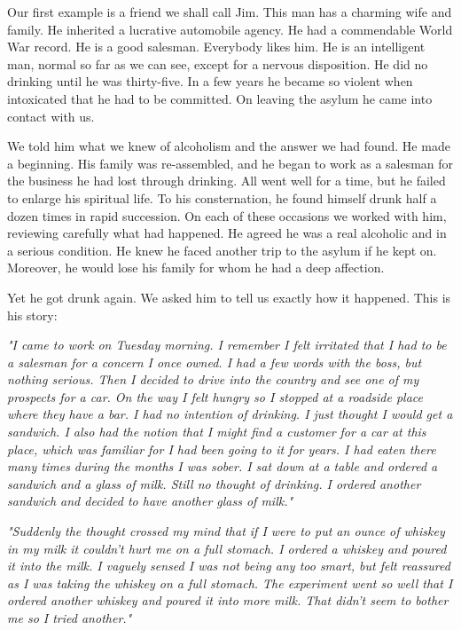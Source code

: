 \begin{biblechapter}
    Our first example is a friend we shall call Jim. 
\verse This man has a charming wife and family. 
\verse He inherited a lucrative automobile agency. 
\verse He had a commendable World War record. 
\verse He is a good salesman. 
\verse Everybody likes him. 
\verse He is an intelligent man, normal so far as we can see, 
    except for a nervous disposition. 
\verse He did no drinking until he was thirty-five. 
\verse In a few years he became so violent when intoxicated 
    that he had to be committed. 
\verse On leaving the asylum he came into contact with us.

\verse We told him what we knew of alcoholism and the answer we had found. 
\verse He made a beginning. 
\verse His family was re-assembled, 
    and he began to work as a salesman 
    for the business he had lost through drinking. 
\verse All went well for a time, 
    but he failed to enlarge his spiritual life. 
\verse To his consternation, 
    he found himself drunk half a dozen times in rapid succession. 
\verse On each of these occasions we worked with him, 
    reviewing carefully what had happened. 
\verse He agreed he was a real alcoholic and in a serious condition. 
\verse He knew he faced another trip to the asylum if he kept on. 
\verse Moreover, he would lose his family for whom he had a deep affection.

\verse Yet he got drunk again. 
\verse We asked him to tell us exactly how it happened. 
\verse This is his story:

\emph{
    "I came to work on Tuesday morning. 
\verse I remember I felt irritated 
    that I had to be a salesman for a concern I once owned. 
\verse I had a few words with the boss, but nothing serious. 
\verse Then I decided to drive into the country 
    and see one of my prospects for a car. 
\verse On the way I felt hungry 
    so I stopped at a roadside place where they have a bar. 
\verse I had no intention of drinking. 
\verse I just thought I would get a sandwich. 
\verse I also had the notion that 
    I might find a customer for a car at this place, 
    which was familiar for I had been going to it for years. 
\verse I had eaten there many times during the months I was sober. 
\verse I sat down at a table and ordered a sandwich and a glass of milk. 
\verse Still no thought of drinking. 
\verse I ordered another sandwich and decided to have another glass of milk."
}

\emph{
\verse"Suddenly the thought crossed my mind 
    that if I were to put an ounce of whiskey in my milk 
    it couldn't hurt me on a full stomach. 
\verse I ordered a whiskey and poured it into the milk. 
\verse I vaguely sensed I was not being any too smart, 
    but felt reassured as I was taking the whiskey on a full stomach. 
\verse The experiment went so well that I ordered another whiskey 
    and poured it into more milk. 
\verse That didn't seem to bother me so I tried another."
}


\end{biblechapter}
